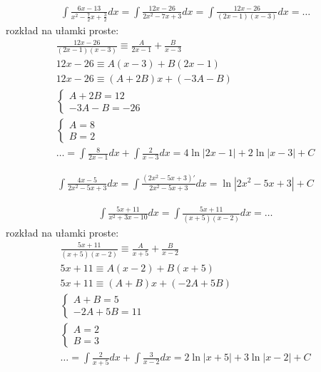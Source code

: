

\begin{gather*}\int \frac{6x-13}{x^2-\frac{7}{2}x+\frac{3}{2}}dx = \int \frac{12x-26}{2x^2-7x+3}dx = \int \frac{12x-26}{(2x-1)(x-3)}dx = \ldots \end{gather*}
rozkład na ułamki proste:
\begin{gather*}\frac{12x-26}{(2x-1)(x-3)} \equiv \frac{A}{2x-1}+\frac{B}{x-3} \\
12x-26 \equiv A(x-3)+B(2x-1) \\
12x-26 \equiv (A+2B)x+(-3A-B) \\
\begin{cases} A+2B=12 \\ -3A-B=-26 \end{cases} \\
\begin{cases} A=8 \\ B=2 \end{cases} \\
\ldots = \int \frac{8}{2x-1}dx + \int \frac{2}{x-3}dx = 4\ln|2x-1|+2\ln|x-3|+C\end{gather*}



\begin{gather*}\int \frac{4x-5}{2x^2-5x+3}dx = \int \frac{(2x^2-5x+3)'}{2x^2-5x+3}dx = \ln|2x^2-5x+3|+C\end{gather*}



\begin{gather*}\int \frac{5x+11}{x^2+3x-10}dx = \int \frac{5x+11}{(x+5)(x-2)}dx =\ldots\end{gather*}
rozkład na ułamki proste:
\begin{gather*}\frac{5x+11}{(x+5)(x-2)} \equiv \frac{A}{x+5}+\frac{B}{x-2} \\
5x+11 \equiv A(x-2)+B(x+5) \\
5x+11 \equiv (A+B)x+(-2A+5B) \\
\begin{cases} A+B=5 \\ -2A+5B=11 \end{cases} \\
\begin{cases} A=2 \\ B=3 \end{cases} \\
\ldots = \int \frac{2}{x+5}dx+\int\frac{3}{x-2}dx = 2\ln|x+5|+3\ln|x-2|+C\end{gather*}


